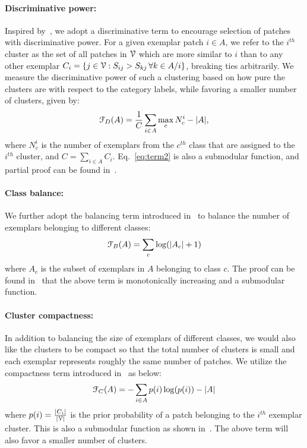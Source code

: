 \documentclass[10pt,twocolumn,letterpaper]{article}
\begin{document}
\paragraph{Discriminative power:}
Inspired by~\cite{jiang2012submodular}, we adopt a discriminative term to
encourage selection of patches with discriminative power. For a given exemplar
patch $i \in A$, we refer to the $i^{th}$ cluster as the set of all patches
in ${\cal V}$ which are more similar to $i$ than to any other exemplar
$C_i = \{j \in {\cal V} : S_{ij} > S_{kj} \, \forall k \in A / i\}$,
breaking ties arbitrarily.
We measure the discriminative power of such a
clustering based on how pure the clusters are with respect to the category
labels, while favoring a smaller number of clusters, given by:
\begin{equation}{\cal F}_{D}(A) = \frac{1}{C} \sum_{i\in A} {\max_c N^i_c}  - \vert A \vert,
\label{eq:term2}
\end{equation}
where $N_c^i$ is the number of exemplars from the $c^{th}$ class that are
assigned to the $i^{th}$ cluster,
and $C=\sum_{i \in A} C_i$.
Eq.~\ref{eq:term2} is also a submodular function, and partial proof can be found in~\cite{jiang2012submodular}.

\paragraph{Class balance:}
We further adopt the balancing term introduced in~\cite{kong2014collaborative}
to balance the number of exemplars belonging to different classes:
\begin{equation}{\cal F}_{B}(A) = \sum_c \log(\vert A_c\vert + 1)
\end{equation}
where $A_c$ is the subset of exemplars in $A$ belonging to class $c$.
The proof can be found in~\cite{kong2014collaborative} that the above term is
monotonically increasing and a submodular function.

\paragraph{Cluster compactness:}
In addition to balancing the size of exemplars of different classes, we
would also like the clusters to be compact so that the total number of clusters
is small and each exemplar represents roughly the same number of patches.  We
utilize the compactness term introduced in~\cite{liu2011entropy} as below:
\begin{equation}{\cal F}_{C}(A) = -\sum_{i\in A} p(i)\log(p(i)) - \vert A \vert
\end{equation}
where $p(i) = \frac{|C_i|}{|{\cal V}|}$ is the prior probability of a
patch belonging to the $i^{th}$ exemplar cluster.
This is also a submodular function as shown in~\cite{liu2011entropy}.
The above term will also favor a smaller number of clusters.
\end{document}
